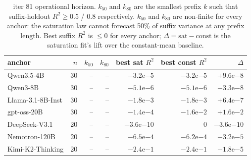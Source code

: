 \begin{table}[h]
\centering
\small
\caption{iter 81 operational horizon.  $k_{50}$ and $k_{80}$ are the
smallest prefix $k$ such that suffix-holdout $R^2 \ge 0.5$ / $0.8$
respectively.  $k_{50}$ and $k_{80}$ are non-finite for every anchor:
the saturation law cannot forecast 50\% of suffix variance at any
prefix length.  Best suffix $R^2$ is $\le 0$ for every anchor;
$\Delta = \mathrm{sat} - \mathrm{const}$ is the saturation fit's lift
over the constant-mean baseline.}
\label{tab:iter81-horizon}
\begin{tabular}{lrrrrrr}
\hline
anchor & $n$ & $k_{50}$ & $k_{80}$ & best sat $R^2$ & best const $R^2$ & $\Delta$ \\
\hline
Qwen3.5-4B & 30 & -- & -- & $-3.2\mathrm{e}{-5}$ & $-3.2\mathrm{e}{-5}$ & $+9.6\mathrm{e}{-8}$ \\
Qwen3-8B & 30 & -- & -- & $-5.1\mathrm{e}{-6}$ & $-5.1\mathrm{e}{-6}$ & $-3.3\mathrm{e}{-8}$ \\
Llama-3.1-8B-Inst & 30 & -- & -- & $-1.8\mathrm{e}{-3}$ & $-1.8\mathrm{e}{-3}$ & $+6.4\mathrm{e}{-7}$ \\
gpt-oss-20B & 30 & -- & -- & $-1.4\mathrm{e}{-4}$ & $-1.6\mathrm{e}{-2}$ & $+1.6\mathrm{e}{-2}$ \\
DeepSeek-V3.1 & 20 & -- & -- & $-3.6\mathrm{e}{-10}$ & $0$ & $-3.6\mathrm{e}{-10}$ \\
Nemotron-120B & 20 & -- & -- & $-6.5\mathrm{e}{-4}$ & $-6.2\mathrm{e}{-4}$ & $-3.2\mathrm{e}{-5}$ \\
Kimi-K2-Thinking & 20 & -- & -- & $-2.4\mathrm{e}{-1}$ & $-2.4\mathrm{e}{-1}$ & $-1.8\mathrm{e}{-5}$ \\
\hline
\end{tabular}
\end{table}